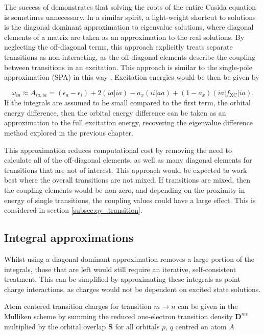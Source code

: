 The success of \dscf demonstrates that solving the roots of the entire Casida equation
is sometimes unnecessary. In a similar spirit, a light-weight shortcut to solutions 
is the diagonal dominant approximation to eigenvalue solutions, where diagonal elements
of a matrix are taken as an approximation to the real solutions. By neglecting the
off-diagonal terms, this approach explicitly treats separate transitions as non-interacting,
as the off-diagonal elements describe the coupling between transitions in an excitation.
This approach is similar to the single-pole approximation (SPA) in this way \cite{Petersilka1996, Appel2006}.
Excitation energies would be then be given by

\begin{equation}
\omega_{ia} \approx A_{ia, ia} = \left( \epsilon_a - \epsilon_i \right) + 2\left(ia|ia\right) - a_x\left(ii|aa\right) + (1- a_x)\left(ia|f_{\text{XC}}|ia\right). 
\label{eq:diag_dom}
\end{equation}
%
If the integrals are assumed to be small compared to the first term, the orbital 
energy difference, then the orbital energy difference can be taken as an approximation 
to the full excitation energy, recovering the eigenvalue difference method explored 
in the previous chapter.

This approximation reduces computational cost by removing the need to calculate
all of the off-diagonal elements, as well as many diagonal elements for transitions
that are not of interest. This approach would be expected to work best where the
overall transitions are not mixed. If transitions are mixed, then the coupling elements
would be non-zero, and depending on the proximity in energy of single transitions,
the coupling values could have a large effect. This is considered in section \ref{subsec:qy_transition}.

\subsection{Integral approximations}
\label{subsec:MNOK}

Whilst using a diagonal dominant approximation removes a large portion of the integrals,
those that are left would still require an iterative, self-consistent treatment. 
This can be simplified by approximating these integrals as point charge interactions, 
as charges would not be dependent on excited state solutions.

Atom centered transition charges for transition $m \rightarrow n$ can be given in
the Mulliken scheme by summing the reduced one-electron transition density $\mathbf{D}^{mn}$
multiplied by the orbital overlap $\mathbf{S}$ for all orbitals $p$, $q$ centred
on atom $A$

